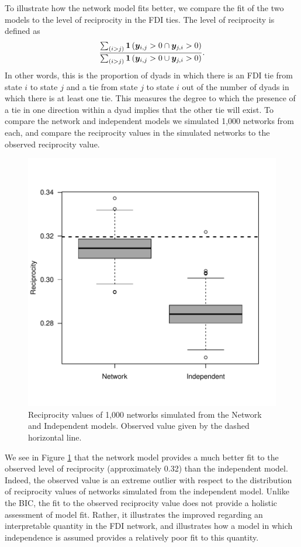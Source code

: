 \documentclass[reqno,onecolumn,letterpaper,12pt]{article}
\begin{document}
To illustrate how the network model fits better, we compare the fit of the two models to the level of reciprocity in the FDI ties. The level of reciprocity is defined as $$ \frac{ \sum_{(i>j)} \text{\bf 1}\left( \bm{y}_{i,j}>0  \cap \bm{y}_{j,i}>0 \right)}{ \sum_{(i>j)} \text{\bf 1}\left( \bm{y}_{i,j}>0  \cup \bm{y}_{j,i}>0 \right)}.$$ In other words, this is the proportion of dyads in which there is an FDI tie from state $i$ to state $j$ and a tie from state $j$ to state $i$ out of the number of dyads in which there is at least one tie. This measures the degree to which the presence of a tie in one direction within a dyad implies that the other tie will exist. To compare the network and independent models we simulated 1,000 networks from each, and compare the reciprocity values in the simulated networks to the observed reciprocity value.
\begin{figure}[!h]
\centering
\includegraphics[scale=.75]{draft_figures/reciprocityFit.pdf} \vspace{-.5cm}
\caption{\label{fig:recipFit} Reciprocity values of 1,000 networks simulated from the Network and Independent models. Observed value given by the dashed horizontal line.}
\end{figure}
We see in Figure \ref{fig:recipFit} that the network model provides a much better fit to the observed level of reciprocity (approximately 0.32) than the independent model. Indeed, the observed value is an extreme outlier with respect to the distribution of reciprocity values of networks simulated from the independent model. Unlike the BIC, the fit to the observed reciprocity value does not provide a holistic assessment of model fit. Rather, it illustrates the improved regarding an interpretable quantity in the FDI network, and illustrates how a model in which independence is assumed provides a relatively poor fit to this quantity.
\end{document}
